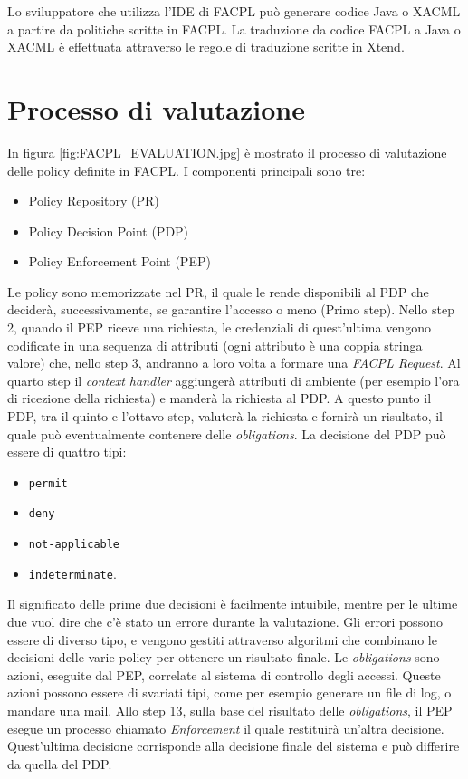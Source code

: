 
Lo sviluppatore che utilizza l'IDE di \ac{FACPL} può generare codice Java o \ac{XACML} a partire da politiche scritte in \ac{FACPL}. La traduzione da codice \ac{FACPL} a Java o \ac{XACML} è effettuata attraverso le regole di traduzione scritte in Xtend.



\section{Processo di valutazione}
\label{sec:valutazione_facpl}


In figura \ref{fig:FACPL_EVALUATION.jpg} è mostrato il processo di valutazione delle policy definite in FACPL.
I componenti principali sono tre:
\begin{itemize}
\item{Policy Repository (PR)}
\item{Policy Decision Point (PDP)}
\item{Policy Enforcement Point (PEP)}
\end{itemize}
Le policy sono memorizzate nel PR, il quale le rende disponibili al PDP che deciderà, successivamente, se garantire l'accesso o meno (Primo step).
Nello step 2, quando il PEP riceve una richiesta, le credenziali di quest'ultima vengono codificate in una sequenza di attributi (ogni attributo è una coppia stringa valore) che, nello step 3, andranno a loro volta a formare una \textit{FACPL Request}.
Al quarto step il \textit{context handler} aggiungerà attributi di ambiente (per esempio l'ora di ricezione della richiesta) e manderà la richiesta al PDP.
A questo punto il PDP, tra il quinto e l'ottavo step, valuterà la richiesta e fornirà un risultato, il quale può eventualmente contenere delle \textit{obligations}.
La decisione del PDP può essere di quattro tipi:
\begin{itemize}
\item \texttt{permit}
\item \texttt{deny}
\item \texttt{not-applicable} 
\item \texttt{indeterminate}.
\end{itemize}
Il significato delle prime due decisioni è facilmente intuibile, mentre per le ultime due vuol dire che c'è stato un errore durante la valutazione.
Gli errori possono essere di diverso tipo, e vengono gestiti attraverso algoritmi che combinano le decisioni delle varie policy per ottenere un risultato finale.
Le \textit{obligations} sono azioni, eseguite dal PEP, correlate al sistema di controllo degli accessi. Queste azioni possono essere di svariati tipi, come per esempio generare un file di log, o mandare una mail.
Allo step 13, sulla base del risultato delle \textit{obligations}, il PEP esegue un processo chiamato \textit{Enforcement} il quale restituirà un'altra decisione.
Quest'ultima decisione corrisponde alla decisione finale del sistema e può differire da quella del PDP.


